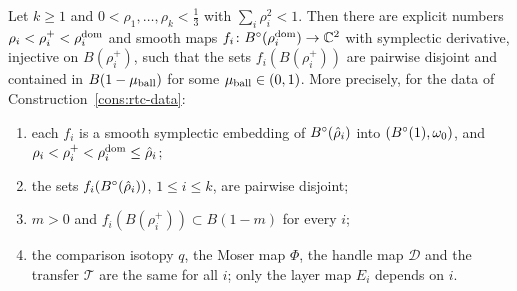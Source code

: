 \begin{theorem}\label{thm:cub-packing}\label{prop:rtc-embeddings}
Let $k\ge1$ and $0<\rho_1,\dots,\rho_k<\frac13$ with $\sum_i\rho_i^2<1$. Then there are explicit numbers
$\rho_i<\rho_i^+<\rho_i^{\rm dom}$ and smooth maps $f_i\colon B^{\circ}(\rho_i^{\rm dom})\to\mathbb{C}^2$ with symplectic derivative, injective
on $B(\rho_i^+)$, such that the sets $f_i(B(\rho_i^+))$ are pairwise disjoint and contained in $B(1-\mu_{\rm ball})$ for some
$\mu_{\rm ball}\in(0,1)$. More precisely, for the data of Construction~\ref{cons:rtc-data}:
\begin{enumerate}[label=(\roman*)]
\item each $f_i$ is a smooth symplectic embedding of $B^{\circ}(\hat\rho_i)$ into $(B^{\circ}(1),\omega_0)$, and
$\rho_i<\rho_i^+<\rho_i^{\rm dom}\le\hat\rho_i$;
\item the sets $f_i(B^{\circ}(\hat\rho_i))$, $1\le i\le k$, are pairwise disjoint;
\item $m>0$ and $f_i(B(\rho_i^+))\subset B(1-m)$ for every $i$;
\item the comparison isotopy $q$, the Moser map $\Phi$, the handle map $\mathcal D$ and the transfer $\mathcal T$ are the same for all $i$;
only the layer map $E_i$ depends on $i$.
\end{enumerate}
\end{theorem}


